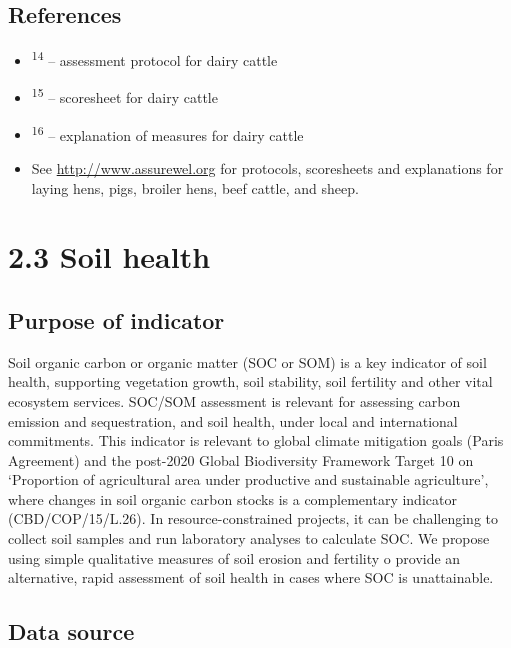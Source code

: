 \documentclass[
  letterpaper,
  DIV=11,
  numbers=noendperiod]{scrreprt}
\providecommand{\tightlist}{%
  \setlength{\itemsep}{0pt}\setlength{\parskip}{0pt}}
\begin{document}
\section{References}\label{references-1}

\begin{itemize}
\tightlist
\item
  \textsuperscript{14} -- assessment protocol for dairy cattle
\item
  \textsuperscript{15} -- scoresheet for dairy cattle
\item
  \textsuperscript{16} -- explanation of measures for dairy cattle
\item
  See \url{http://www.assurewel.org} for protocols, scoresheets and
  explanations for laying hens, pigs, broiler hens, beef cattle, and
  sheep.
\end{itemize}

\chapter{2.3 Soil health}\label{soil-health}

\section{Purpose of indicator}\label{purpose-of-indicator-2}

Soil organic carbon or organic matter (SOC or SOM) is a key indicator of
soil health, supporting vegetation growth, soil stability, soil
fertility and other vital ecosystem services. SOC/SOM assessment is
relevant for assessing carbon emission and sequestration, and soil
health, under local and international commitments. This indicator is
relevant to global climate mitigation goals (Paris Agreement) and the
post-2020 Global Biodiversity Framework Target 10 on `Proportion of
agricultural area under productive and sustainable agriculture', where
changes in soil organic carbon stocks is a complementary indicator
(CBD/COP/15/L.26). In resource-constrained projects, it can be
challenging to collect soil samples and run laboratory analyses to
calculate SOC. We propose using simple qualitative measures of soil
erosion and fertility o provide an alternative, rapid assessment of soil
health in cases where SOC is unattainable.

\section{Data source}\label{data-source-2}
\end{document}

